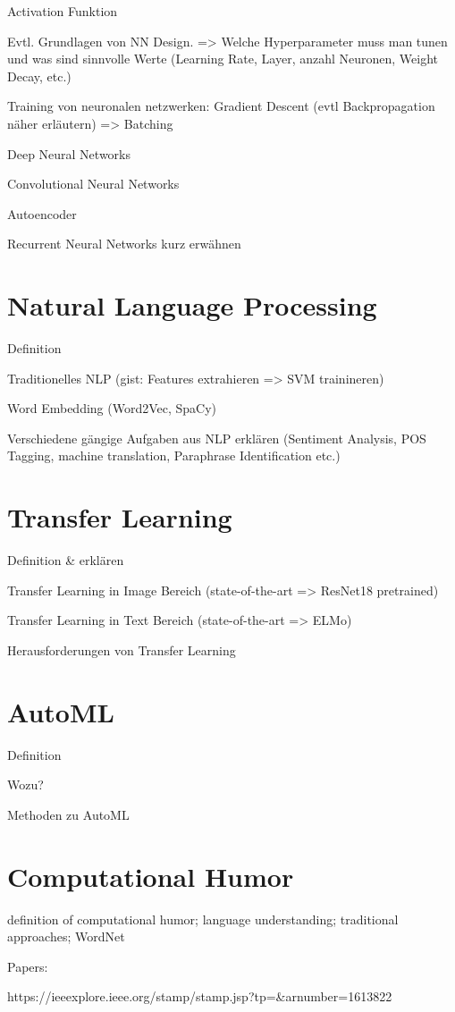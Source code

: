 \documentclass[draft,final,oneside]{vutinfth} %
\begin{document}
Activation Funktion

Evtl. Grundlagen von NN Design. => Welche Hyperparameter muss man tunen und was sind sinnvolle Werte (Learning Rate, Layer, anzahl Neuronen, Weight Decay, etc.) 

Training von neuronalen netzwerken: Gradient Descent (evtl Backpropagation näher erläutern) => Batching

Deep Neural Networks

Convolutional Neural Networks

Autoencoder

Recurrent Neural Networks kurz erwähnen

\section{Natural Language Processing}
Definition

Traditionelles NLP (gist: Features extrahieren => SVM trainineren)

Word Embedding (Word2Vec, SpaCy)

Verschiedene gängige Aufgaben aus NLP erklären (Sentiment Analysis, POS Tagging, machine translation, Paraphrase Identification etc.)

\section{Transfer Learning}

Definition \& erklären

Transfer Learning in Image Bereich (state-of-the-art => ResNet18 pretrained)

Transfer Learning in Text Bereich (state-of-the-art => ELMo)

Herausforderungen von Transfer Learning


\section{AutoML}
Definition

Wozu?

Methoden zu AutoML

\section{Computational Humor}
definition of computational humor; language understanding; traditional approaches; WordNet 

Papers: 

https://ieeexplore.ieee.org/stamp/stamp.jsp?tp=\&arnumber=1613822
\end{document}
